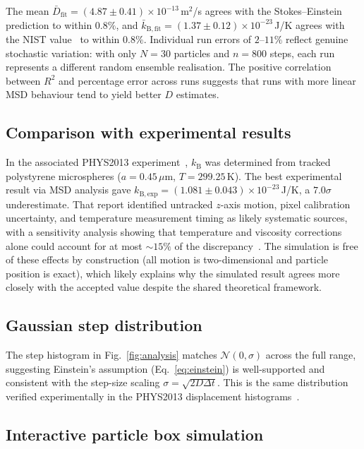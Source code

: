 \documentclass[prb,twocolumn]{revtex4-1}
\begin{document}
The mean $\bar{D}_{\mathrm{fit}} = (4.87\pm0.41)\times10^{-13}$\,m$^2$/s agrees with the Stokes--Einstein prediction to within $0.8\%$, and $\bar{k}_{\mathrm{B,fit}} = (1.37\pm0.12)\times10^{-23}$\,J/K agrees with the NIST value~\cite{nist} to within $0.8\%$. Individual run errors of $2$--$11\%$ reflect genuine stochastic variation: with only $N = 30$ particles and $n = 800$ steps, each run represents a different random ensemble realisation. The positive correlation between $R^2$ and percentage error across runs suggests that runs with more linear MSD behaviour tend to yield better $D$ estimates.

\subsection{Comparison with experimental results}

In the associated PHYS2013 experiment~\cite{lukacs2026lab}, $k_{\mathrm{B}}$ was determined from tracked polystyrene microspheres ($a = 0.45\,\mu$m, $T = 299.25$\,K). The best experimental result via MSD analysis gave $k_{\mathrm{B,exp}} = (1.081\pm0.043)\times10^{-23}$\,J/K, a $7.0\sigma$ underestimate. That report identified untracked $z$-axis motion, pixel calibration uncertainty, and temperature measurement timing as likely systematic sources, with a sensitivity analysis showing that temperature and viscosity corrections alone could account for at most $\sim15\%$ of the discrepancy~\cite{lukacs2026lab}. The simulation is free of these effects by construction (all motion is two-dimensional and particle position is exact), which likely explains why the simulated result agrees more closely with the accepted value despite the shared theoretical framework.

\subsection{Gaussian step distribution}

The step histogram in Fig.~\ref{fig:analysis} matches $\mathcal{N}(0,\sigma)$ across the full range, suggesting Einstein's assumption (Eq.~\ref{eq:einstein}) is well-supported and consistent with the step-size scaling $\sigma = \sqrt{2D\Delta t}$. This is the same distribution verified experimentally in the PHYS2013 displacement histograms~\cite{lukacs2026lab}.

\subsection{Interactive particle box simulation}
\end{document}
